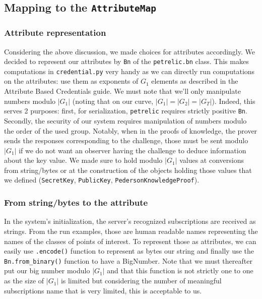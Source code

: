 \documentclass[10pt,conference,compsocconf]{IEEEtran}
\begin{document}
\subsection{Mapping to the \texttt{AttributeMap}}
\subsubsection{Attribute representation}
Considering the above discussion, we made choices for attributes accordingly. We decided to represent our attributes by \texttt{Bn} of the \texttt{petrelic.bn} class. This makes computations in \texttt{credential.py} very handy as we can directly run computations on the attributes: use them as exponents of $G_1$ elements as described in the Attribute Based Credentials guide. We must note that we'll only manipulate numbers modulo $|G_1|$ (noting that on our curve, $|G_1|=|G_2|=|G_T|$). Indeed, this serves 2 purposes: first, for serialization, \texttt{petrelic} requires strictly positive \texttt{Bn}. Secondly, the security of our system requires manipulation of numbers modulo the order of the used group. Notably, when in the proofs of knowledge, the prover sends the responses corresponding to the challenge, those must be sent modulo $|G_1|$ if we do not want an observer having the challenge to deduce information about the key value. We made sure to hold modulo $|G_1|$ values at conversions from string/bytes or at the construction of the objects holding those values that we defined (\texttt{SecretKey}, \texttt{PublicKey}, \texttt{PedersonKnowledgeProof}).

\subsubsection{From string/bytes to the attribute}
In the system's initialization, the server's recognized subscriptions are received as strings. From the run examples, those are human readable names representing the names of the classes of points of interest. To represent those as attributes, we can easily use \texttt{.encode()} function to represent as bytes our string and finally use the \texttt{Bn.from\_binary()} function to have a BigNumber. Note that we must thereafter put our big number modulo $|G_1|$ and that this function is not strictly one to one as the size of $|G_1|$ is limited but considering the number of meaningful subscriptions name that is very limited, this is acceptable to us.
\end{document}
